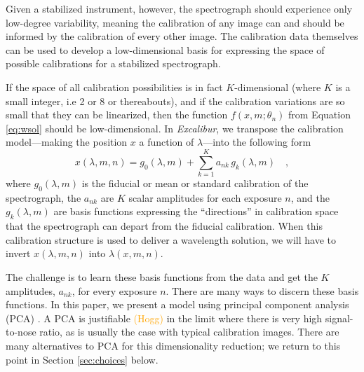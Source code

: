 \documentclass[modern]{aastex63}
\newcommand{\project}[1]{\textsl{#1}}
\newcommand{\name}{\project{Excalibur}}
\newcommand{\lz}[1]{\textcolor{orange}{#1}}
\begin{document}
Given a stabilized instrument, however, the spectrograph should experience only low-degree variability, meaning the calibration of any image can and should be informed by the calibration of every other image.  The calibration data themselves can be used to develop a low-dimensional basis for expressing the space of possible calibrations for a stabilized spectrograph.

If the space of all calibration possibilities is in fact $K$-dimensional (where $K$ is a small integer, i.e 2 or 8 or thereabouts), and if the calibration variations are so small that they can be linearized, then the function $f(x,m;\theta_{n})$ from Equation \ref{eq:wsol} should be low-dimensional.  In \name, we transpose the calibration model---making the position $x$ a function of $\lambda$---into the following form
\begin{equation}
x(\lambda,m,n) = g_0(\lambda,m) + \sum_{k=1}^K a_{nk}\,g_k(\lambda,m)
\quad ,
\label{eq:excl_wsol}
\end{equation}
where
$g_0(\lambda,m)$ is the fiducial or mean or standard calibration of the spectrograph,
the $a_{nk}$ are $K$ scalar amplitudes for each exposure $n$,
and the $g_k(\lambda,m)$ are basis functions expressing the ``directions'' in calibration space that the spectrograph can depart from the fiducial calibration.  When this calibration structure is used to deliver a wavelength solution, we will have to invert $x(\lambda,m,n)$ into $\lambda(x,m,n)$.

The challenge is to learn these basis functions from the data and get the $K$ amplitudes, $a_{nk}$, for every exposure $n$.  There are many ways to discern these basis functions.  In this paper, we present a model using principal component analysis (PCA) \citep{wiki_pca}.  A PCA is justifiable \lz{(Hogg)} in the limit where there is very high signal-to-nose ratio, as is usually the case with typical calibration images.  There are many alternatives to PCA for this dimensionality reduction; we return to this point in Section \ref{sec:choices} below.
\end{document}
